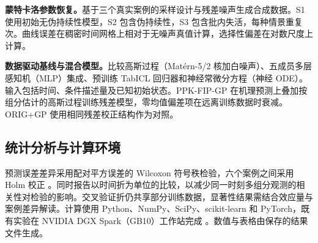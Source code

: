 \textbf{蒙特卡洛参数恢复。}基于三个真实案例的采样设计与残差噪声生成合成数据。S1 使用初始无伪持续性模型，S2 包含伪持续性，S3 包含批内失活，每种情景重复 \NSimReps{} 次。曲线误差在稠密时间网格上相对于无噪声真值计算，选择性偏差在对数尺度上计算。

\textbf{数据驱动基线与混合模型。}比较高斯过程（Matérn-5/2 核加白噪声）、五成员多层感知机（MLP）集成、预训练 TabICL 回归器和神经常微分方程（神经 ODE）\cite{rasmussen2006,qu2025tabicl,chen2018}。输入包括时间、条件描述量及已知初始状态。PPK-FIP-GP 在机理预测上叠加按组分估计的高斯过程训练残差模型，零均值偏差项在远离训练数据时衰减。ORIG+GP 使用相同残差校正结构作为对照。

\subsection{统计分析与计算环境}
预测误差差异采用配对平方误差的 Wilcoxon 符号秩检验，六个案例之间采用 Holm 校正 \cite{wilcoxon1945,holm1979}。同时报告以时间折为单位的比较，以减少同一时刻多组分观测的相关性对检验的影响。交叉验证折仍共享部分训练数据，显著性结果需结合效应量与案例差异解读。计算使用 Python、NumPy、SciPy、scikit-learn 和 PyTorch，既有实验在 NVIDIA DGX Spark（GB10）工作站完成 \cite{virtanen2020}。数值与表格由保存的结果文件生成。
